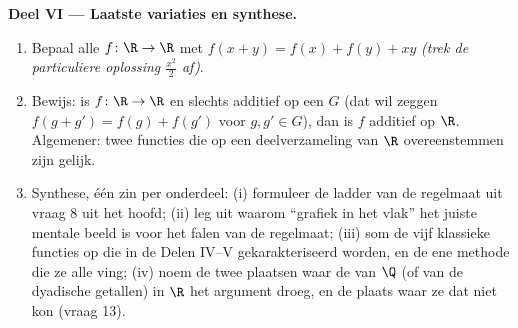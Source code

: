 \begin{problem}[{Weekendopgave --- $f(x + y) = f(x) + f(y)$: regelmaat
dwingt lineariteit af, en het portret van de monsters}]
\medskip
\noindent\textbf{Deel VI --- Laatste variaties en synthese.}
\begin{enumerate}[resume]
  \item Bepaal alle  $f \colon \R \to \R$ met $f(x + y) = f(x) +
        f(y) + xy$ \emph{(trek de particuliere oplossing
        $\frac{x^2}{2}$ af)}.
  \item Bewijs: is $f \colon \R \to \R$  en slechts additief op
        een \emph{ } $G$ (dat wil zeggen $f(g + g') =
        f(g) + f(g')$ voor $g, g' \in G$), dan is $f$ additief op $\R$.
        Algemener: twee  functies die op een 
        deelverzameling van $\R$ overeenstemmen zijn gelijk.
  \item Synthese, één zin per onderdeel: (i) formuleer de ladder van de
        regelmaat uit vraag 8 uit het hoofd; (ii) leg uit waarom
        ``grafiek  in het vlak'' het juiste mentale beeld is voor
        het falen van de regelmaat; (iii) som de vijf klassieke functies
        op die in de Delen IV--V gekarakteriseerd worden, en de ene
        methode die ze alle ving; (iv) noem de twee plaatsen waar de
         van $\Q$ (of van de dyadische getallen) in $\R$ het
        argument droeg, en de plaats waar ze dat niet kon (vraag 13).
\end{enumerate}
\end{problem}
